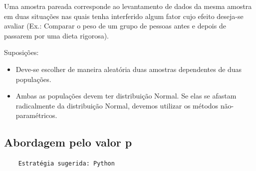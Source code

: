 Uma amostra pareada corresponde ao levantamento de dados da mesma amostra em duas situações nas quais tenha interferido algum fator cujo efeito deseja-se avaliar (Ex.: Comparar o peso de um grupo de pessoas antes e depois de passarem por uma dieta rigorosa).

Suposições:
\begin{itemize}
	\item Deve-se escolher de maneira aleatória duas amostras dependentes de duas populações.
	\item Ambas as populações devem ter distribuição Normal. Se elas se afastam radicalmente da distribuição Normal, devemos utilizar os métodos não-paramétricos.
\end{itemize}

\subsection{Abordagem pelo valor p}

\begin{verbatim}
	Estratégia sugerida: Python 
\end{verbatim}

